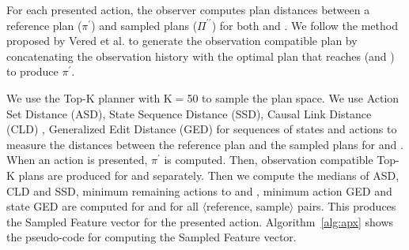 For each presented action, the observer computes plan distances between a reference plan ($\pi^\prime$) and sampled plans ($\Pi^{\prime\prime}$) for both \undesired and \desired.
We follow the method proposed by Vered et al. \citeyear{vered2017} to generate the observation compatible plan by concatenating the observation history with the optimal plan that reaches \undesired (and \desired) to produce $\pi^\prime$.
 
We use the Top-K planner with K$=$50 to sample the plan space.
We use Action Set Distance (ASD), State Sequence Distance (SSD), Causal Link Distance (CLD) \cite{nguyen2012generating}, Generalized Edit Distance (GED) for sequences of states and actions \cite{sohrabi2016finding} to measure the distances between the reference plan and the sampled plans for \desired and \undesired. When an action is presented, $\pi^\prime$ is computed. 
Then, observation compatible Top-K plans are produced for \undesired and \desired separately. 
Then we compute the medians of ASD, CLD and SSD, minimum remaining actions to \undesired and \desired, minimum action GED and state GED are computed for \undesired and \desired for all $\langle$reference, sample$\rangle$ pairs. 
This produces the Sampled Feature vector for the presented action. Algorithm~\ref{alg:apx} shows the pseudo-code for computing the Sampled Feature vector.

